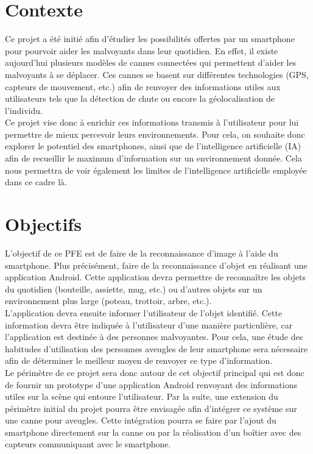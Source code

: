 \documentclass[UTF8]{EPURapport}
\begin{document}
\section{Contexte}

Ce projet a été initié afin d'étudier les possibilités offertes par un smartphone pour pourvoir aider les malvoyants dans leur quotidien. En effet, il existe aujourd'hui plusieurs modèles de cannes connectées qui permettent d'aider les malvoyants à se déplacer. Ces cannes se basent sur différentes technologies (GPS, capteurs de mouvement, etc.) afin de renvoyer des informations utiles aux utilisateurs tels que la détection de chute ou encore la géolocalisation de l'individu.\\

Ce projet vise donc à enrichir ces informations transmis à l'utilisateur pour lui permettre de mieux percevoir leurs environnements. Pour cela, on souhaite donc explorer le potentiel des smartphones, ainsi que de l'intelligence artificielle (IA) afin de recueillir le maximum d'information sur un environnement donnée. Cela nous permettra de voir également les limites de l'intelligence artificielle employée dans ce cadre là.

\section{Objectifs}

L'objectif de ce PFE est de faire de la reconnaissance d'image à l'aide du smartphone. Plus précisément, faire de la reconnaissance d'objet en réalisant une application Android. Cette application devra permettre de reconnaître les objets du quotidien (bouteille, assiette, mug, etc.) ou d'autres objets sur un environnement plus large (poteau, trottoir, arbre, etc.).\\

L’application devra ensuite informer l’utilisateur de l’objet identifié. Cette information devra être indiquée à l’utilisateur d’une manière particulière, car l’application est destinée à des personnes malvoyantes. Pour cela, une étude des habitudes d'utilisation des personnes aveugles de leur smartphone sera nécessaire afin de déterminer le meilleur moyen de renvoyer ce type d'information.\\

Le périmètre de ce projet sera donc autour de cet objectif principal qui est donc de fournir un prototype d'une application Android renvoyant des informations utiles sur la scène qui entoure l'utilisateur. Par la suite, une extension du périmètre initial du projet pourra être envisagée afin d'intégrer ce système sur une canne pour aveugles. Cette intégration pourra se faire par l'ajout du smartphone directement sur la canne ou par la réalisation d'un boîtier avec des capteurs communiquant avec le smartphone.\\
\end{document}

